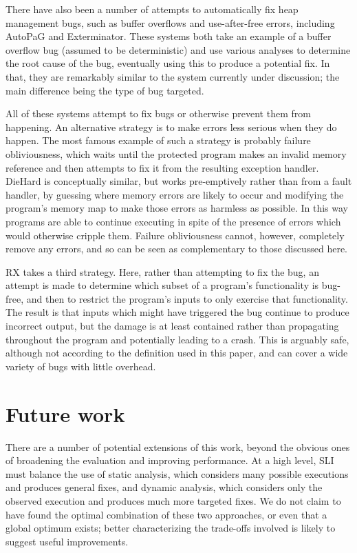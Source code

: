 \documentclass[10pt,twocolumn,preprint,natbib,authoryear]{sigplanconf}
\begin{document}
There have also been a number of attempts to automatically fix heap
management bugs, such as buffer overflows and use-after-free errors,
including AutoPaG\cite{Lin2007} and Exterminator\cite{Novark2007}.
These systems both take an example of a buffer overflow bug (assumed
to be deterministic) and use various analyses to determine the root
cause of the bug, eventually using this to produce a potential fix.
In that, they are remarkably similar to the system currently under
discussion; the main difference being the type of bug targeted.

All of these systems attempt to fix bugs or otherwise prevent them
from happening.  An alternative strategy is to make errors less
serious when they do happen.  The most famous example of such a
strategy is probably failure obliviousness\cite{Rinard2004}, which
waits until the protected program makes an invalid memory reference
and then attempts to fix it from the resulting exception handler.
DieHard\cite{Berger2006} is conceptually similar, but works
pre-emptively rather than from a fault handler, by guessing where
memory errors are likely to occur and modifying the program's memory
map to make those errors as harmless as possible.  In this way
programs are able to continue executing in spite of the presence of
errors which would otherwise cripple them.  Failure obliviousness
cannot, however, completely remove any errors, and so can be seen as
complementary to those discussed here.

RX\cite{Qin2007} takes a third strategy.  Here, rather than
attempting to fix the bug, an attempt is made to determine which
subset of a program's functionality is bug-free, and then to restrict
the program's inputs to only exercise that functionality.  The result
is that inputs which might have triggered the bug continue to produce
incorrect output, but the damage is at least contained rather than
propagating throughout the program and potentially leading to a crash.
This is arguably safe, although not according to the definition used
in this paper, and can cover a wide variety of bugs with little
overhead.

\section{Future work}

There are a number of potential extensions of this work, beyond the
obvious ones of broadening the evaluation and improving performance.
At a high level, SLI must balance the use of static analysis, which
considers many possible executions and produces general fixes, and
dynamic analysis, which considers only the observed execution and
produces much more targeted fixes.  We do not claim to have found the
optimal combination of these two approaches, or even that a global
optimum exists; better characterizing the trade-offs involved is
likely to suggest useful improvements.
\end{document}
